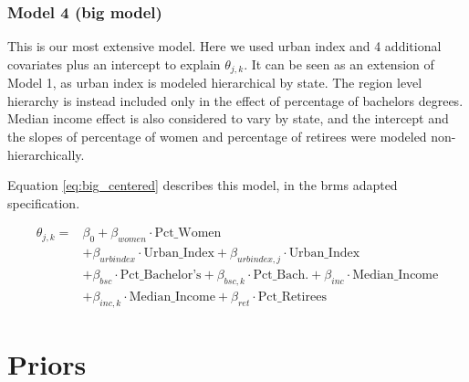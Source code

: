 \documentclass[12pt]{article}
\begin{document}
\subsubsection*{Model 4 (big model)}


This is our most extensive model.
Here we used urban index and 4 additional covariates plus an intercept to explain $\theta_{j,k}$.
It can be seen as an extension of Model 1, as urban index is modeled hierarchical by state. The region level hierarchy is instead included only in the effect of percentage of bachelors degrees.
Median income effect is also considered to vary by state, and the intercept and the slopes of percentage of women and percentage of retirees were modeled non-hierarchically.

Equation \ref{eq:big_centered} describes this model, in the brms adapted specification.

\begin{equation} \label{eq:big_centered}
	\begin{aligned}
		\theta_{j,k} = & \beta_0 + \beta_{women} \cdot \text{Pct\_Women}                                                                              \\
		& + \beta_{urbindex} \cdot \text{Urban\_Index} + \beta_{urbindex, j} \cdot \text{Urban\_Index}                                 \\
		& + \beta_{bsc} \cdot \text{Pct\_Bachelor's} + \beta_{bsc,k} \cdot \text{Pct\_Bach.} + \beta_{inc} \cdot \text{Median\_Income} \\
		& + \beta_{inc,k} \cdot \text{Median\_Income} + \beta_{ret} \cdot \text{Pct\_Retirees}
	\end{aligned}
\end{equation}













\section{Priors}
\end{document}
